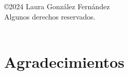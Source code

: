 \documentclass[a4paper, 12pt, oneside]{book}
\begin{document}
\chapter*{}
\thispagestyle{empty}

\begin{flushright}
\begin{minipage}{8cm}
\raggedleft
©2024 Laura González Fernández  \\
Algunos derechos reservados. \\
\doclicenseLongText \\
\vspace{0.5cm}
\doclicenseImage
\end{minipage}

\end{flushright}


\chapter*{Agradecimientos}
\thispagestyle{empty}




\end{document}
